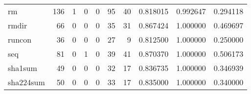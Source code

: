 \begin{tabular}{lrrrrrrrrr}
rm        &                                       136 &                                                  1 &                                                  0 &                                                  0 &                                                 95 &                                                 40 &                                           0.818015 &                               0.992647 &                             0.294118 \\
rmdir     &                                        66 &                                                  0 &                                                  0 &                                                  0 &                                                 35 &                                                 31 &                                           0.867424 &                               1.000000 &                             0.469697 \\
runcon    &                                        36 &                                                  0 &                                                  0 &                                                  0 &                                                 27 &                                                  9 &                                           0.812500 &                               1.000000 &                             0.250000 \\
seq       &                                        81 &                                                  0 &                                                  1 &                                                  0 &                                                 39 &                                                 41 &                                           0.870370 &                               1.000000 &                             0.506173 \\
sha1sum   &                                        49 &                                                  0 &                                                  0 &                                                  0 &                                                 32 &                                                 17 &                                           0.836735 &                               1.000000 &                             0.346939 \\
sha224sum &                                        50 &                                                  0 &                                                  0 &                                                  0 &                                                 33 &                                                 17 &                                           0.835000 &                               1.000000 &                             0.340000 \\

\end{tabular}

